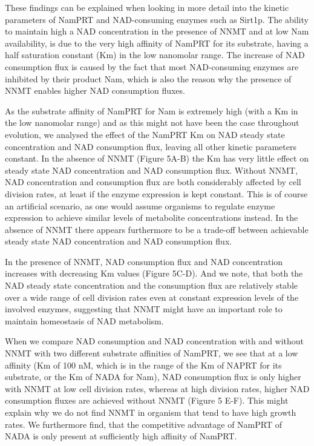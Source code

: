 These findings can be explained when looking in more detail into the kinetic parameters of NamPRT and NAD-consuming enzymes such as Sirt1p. The ability to maintain high a NAD concentration in the presence of NNMT and at low Nam availability, is due to the very high affinity of NamPRT for its substrate, having a half saturation constant (Km) in the low nanomolar range. The increase of NAD consumption flux is caused by the fact that most NAD-consuming enzymes are inhibited by their product Nam, which is also the reason why the presence of NNMT enables higher NAD consumption fluxes.

As the substrate affinity of NamPRT for Nam is extremely high (with a Km in the low nanomolar range) and as this might not have been the case throughout evolution, we analysed the effect of the NamPRT Km on NAD steady state concentration and NAD consumption flux, leaving all other kinetic parameters constant. In the absence of NNMT (Figure 5A-B) the Km has very little effect on steady state NAD concentration and NAD consumption flux. Without NNMT, NAD concentration and consumption flux are both considerably affected by cell division rates, at least if the enzyme expression is kept constant. This is of course an artificial scenario, as one would assume organisms to regulate enzyme expression to achieve similar levels of metabolite concentrations instead. In the absence of NNMT there appears furthermore to be a trade-off between achievable steady state NAD concentration and NAD consumption flux.

In the presence of NNMT, NAD consumption flux and NAD concentration increases with decreasing Km values (Figure 5C-D). And we note, that both the NAD steady state concentration and the consumption flux are relatively stable over a wide range of cell division rates even at constant expression levels of the involved enzymes, suggesting that NNMT might have an important role to maintain homeostasis of NAD metabolism.

When we compare NAD consumption and NAD concentration with and without NNMT with two different substrate affinities of NamPRT, we see that at a low affinity (Km of 100 nM, which is in the range of the Km of NAPRT for its substrate, or the Km of NADA for Nam), NAD consumption flux is only higher with NNMT at low cell division rates, whereas at high division rates, higher NAD consumption fluxes are achieved without NNMT (Figure 5 E-F). This might explain why we do not find NNMT in organism that tend to have high growth rates. We furthermore find, that the competitive advantage of NamPRT of NADA is only present at sufficiently high affinity of NamPRT.

